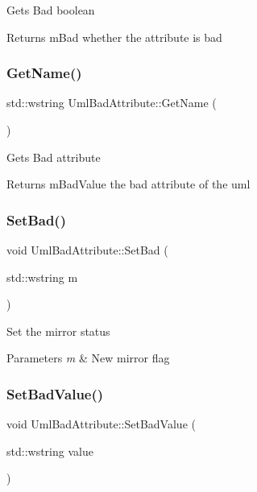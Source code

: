 Gets Bad boolean \begin{DoxyReturn}{Returns}
m\+Bad whether the attribute is bad 
\end{DoxyReturn}
\mbox{\label{class_uml_bad_attribute_ae41e1ecb7b0f29eeb17e1f5a9baaa3e5}} 
\subsubsection{\texorpdfstring{GetName()}{GetName()}}
{\footnotesize\ttfamily std\+::wstring Uml\+Bad\+Attribute\+::\+Get\+Name (\begin{DoxyParamCaption}{ }\end{DoxyParamCaption})\hspace{0.3cm}{\ttfamily [inline]}}

Gets Bad attribute \begin{DoxyReturn}{Returns}
m\+Bad\+Value the bad attribute of the uml 
\end{DoxyReturn}
\mbox{\label{class_uml_bad_attribute_a2194494496b2f67bd599a410acdedefb}} 
\subsubsection{\texorpdfstring{SetBad()}{SetBad()}}
{\footnotesize\ttfamily void Uml\+Bad\+Attribute\+::\+Set\+Bad (\begin{DoxyParamCaption}\item[{std\+::wstring}]{m }\end{DoxyParamCaption})\hspace{0.3cm}{\ttfamily [inline]}}

Set the mirror status 
\begin{DoxyParams}{Parameters}
{\em m} & New mirror flag \\
\hline
\end{DoxyParams}
\mbox{\label{class_uml_bad_attribute_aa9257887d957755f3eb007266c35838b}} 
\subsubsection{\texorpdfstring{SetBadValue()}{SetBadValue()}}
{\footnotesize\ttfamily void Uml\+Bad\+Attribute\+::\+Set\+Bad\+Value (\begin{DoxyParamCaption}\item[{std\+::wstring}]{value }\end{DoxyParamCaption})\hspace{0.3cm}{\ttfamily [inline]}}

